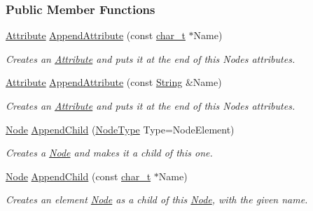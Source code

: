 \subsubsection*{Public Member Functions}
\begin{DoxyCompactItemize}
\item 
\hyperlink{classphys_1_1xml_1_1Attribute}{Attribute} \hyperlink{classphys_1_1xml_1_1Node_a09ae0a1499b13de2db447fc95dd3b747}{AppendAttribute} (const \hyperlink{namespacephys_1_1xml_afc87705cd1c2917d87b879715a2d8f6e}{char\_\-t} $\ast$Name)
\begin{DoxyCompactList}\small\item\em Creates an \hyperlink{classphys_1_1xml_1_1Attribute}{Attribute} and puts it at the end of this Nodes attributes. \item\end{DoxyCompactList}\item 
\hyperlink{classphys_1_1xml_1_1Attribute}{Attribute} \hyperlink{classphys_1_1xml_1_1Node_a76c6d68f5099bc7aac4d06b11beba4fd}{AppendAttribute} (const \hyperlink{namespacephys_1_1xml_a4d8ca7638328d16d303e5a4c849f4704}{String} \&Name)
\begin{DoxyCompactList}\small\item\em Creates an \hyperlink{classphys_1_1xml_1_1Attribute}{Attribute} and puts it at the end of this Nodes attributes. \item\end{DoxyCompactList}\item 
\hyperlink{classphys_1_1xml_1_1Node}{Node} \hyperlink{classphys_1_1xml_1_1Node_aef276a1af2f747e56072173c18e8382d}{AppendChild} (\hyperlink{namespacephys_1_1xml_a668b0cc666a9d49f7c7222a7552115d3}{NodeType} Type=NodeElement)
\begin{DoxyCompactList}\small\item\em Creates a \hyperlink{classphys_1_1xml_1_1Node}{Node} and makes it a child of this one. \item\end{DoxyCompactList}\item 
\hyperlink{classphys_1_1xml_1_1Node}{Node} \hyperlink{classphys_1_1xml_1_1Node_a8471b4d57778a081d07cdf7716e574db}{AppendChild} (const \hyperlink{namespacephys_1_1xml_afc87705cd1c2917d87b879715a2d8f6e}{char\_\-t} $\ast$Name)
\begin{DoxyCompactList}\small\item\em Creates an element \hyperlink{classphys_1_1xml_1_1Node}{Node} as a child of this \hyperlink{classphys_1_1xml_1_1Node}{Node}, with the given name. \item\end{DoxyCompactList}\item 

\end{DoxyCompactItemize}
